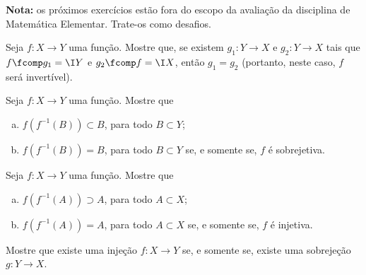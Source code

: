 \textbf{Nota:} os próximos exercícios estão fora do escopo da avaliação da disciplina de Matemática Elementar.
Trate-os como desafios.

\begin{challenge}
    Seja $f: X \to Y$ uma função. Mostre que, se existem $g_1 : Y
\to X$ e $g_2 : Y \to X$ tais que $f \fcomp g_1 = \I Y$ e $g_2 \fcomp
f = \I X$, então $g_1 = g_2$ (portanto, neste caso, $f$ será
invertível).
\end{challenge}

\begin{challenge}
    Seja $f: X \to Y$ uma função. Mostre que
\begin{enumerate}[(a)]
  \item $f(f^{-1}(B)) \subset B$, para todo $B \subset Y$;
  \item $f(f^{-1}(B)) = B$, para todo $B \subset Y$ se, e
  somente se, $f$ é sobrejetiva.
\end{enumerate}
\end{challenge}

\begin{challenge}
    Seja $f: X \to Y$ uma função. Mostre que
\begin{enumerate}[(a)]
  \item $f(f^{-1}(A)) \supset A$, para todo $A \subset X$;
  \item $f(f^{-1}(A)) = A$, para todo $A \subset X$ se, e
  somente se, $f$ é injetiva.
\end{enumerate}
\end{challenge}

\begin{challenge}
    Mostre que existe uma injeção $f: X \to Y$ se, e somente se,
existe uma sobrejeção $g: Y \to X$.
\end{challenge}


